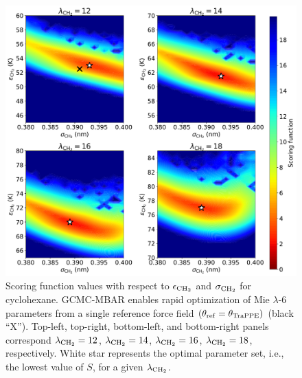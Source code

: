 \documentclass[journal=jced,manuscript=article]{achemso}
\begin{document}
	\begin{figure}[htb!]
		\centering
		\includegraphics[width=6.4in]{CYC6_scoring_function_lam.pdf}
		\caption{Scoring function values with respect to $\epsilon_{\rm CH_2}$ and $\sigma_{\rm CH_2}$ for cyclohexane. GCMC-MBAR enables rapid optimization of Mie $\lambda$-6 parameters from a single reference force field $(\theta_{\rm ref} = \theta_{\rm TraPPE})$ (black ``X''). Top-left, top-right, bottom-left, and bottom-right panels correspond $\lambda_{\rm CH_2} = 12$, $\lambda_{\rm CH_2} = 14$, $\lambda_{\rm CH_2} = 16$, $\lambda_{\rm CH_2} = 18$, respectively. White star represents the optimal parameter set, i.e., the lowest value of $S$, for a given $\lambda_{\rm CH_2}$.}
		\label{fig:Score_CYC6}
	\end{figure} 
\end{document}
